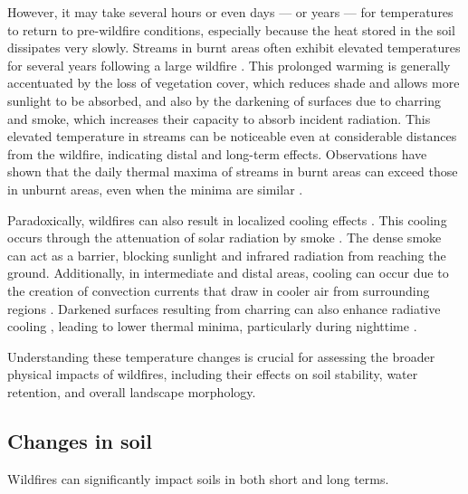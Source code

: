 \documentclass[
  12 pt,
]{Nemilov}
\begin{document}
However, it may take several hours or even days --- or years --- for temperatures to return to pre-wildfire conditions, especially because the heat stored in the soil dissipates very slowly. Streams in burnt areas often exhibit elevated temperatures for several years following a large wildfire \citep{rhoades2011influence}. This prolonged warming is generally accentuated by the loss of vegetation cover, which reduces shade and allows more sunlight to be absorbed, and also by the darkening of surfaces due to charring and smoke, which increases their capacity to absorb incident radiation. This elevated temperature in streams can be noticeable even at considerable distances from the wildfire, indicating distal and long-term effects. Observations have shown that the daily thermal maxima of streams in burnt areas can exceed those in unburnt areas, even when the minima are similar \citep{hitt2003immediate}.

Paradoxically, wildfires can also result in localized cooling effects \citep{david2018wildfire}. This cooling occurs through the attenuation of solar radiation by smoke \citep{david2018wildfire, huang2023smoke, kochanski2019modeling, stone2011empirical}. The dense smoke can act as a barrier, blocking sunlight and infrared radiation from reaching the ground. Additionally, in intermediate and distal areas, cooling can occur due to the creation of convection currents that draw in cooler air from surrounding regions \citep{rosenfeld2007chisholm, tedim2018defining, zhang2019wildfire}. Darkened surfaces resulting from charring can also enhance radiative cooling \citep{huang2023smoke, liu2022significant, stone2011empirical}, leading to lower thermal minima, particularly during nighttime \citep{huang2023smoke}.

Understanding these temperature changes is crucial for assessing the broader physical impacts of wildfires, including their effects on soil stability, water retention, and overall landscape morphology.

\subsection{Changes in soil}\label{changes-in-soil}

Wildfires can significantly impact soils in both short and long terms.
\end{document}
